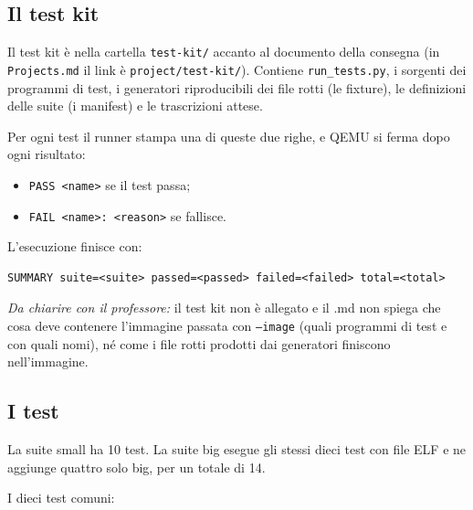 \subsection{Il test kit}

Il test kit è nella cartella \texttt{test-kit/} accanto al documento della consegna (in \texttt{Projects.md} il link è \texttt{project/test-kit/}). Contiene \texttt{run\_tests.py}, i sorgenti dei programmi di test, i generatori riproducibili dei file rotti (le fixture), le definizioni delle suite (i manifest) e le trascrizioni attese.

Per ogni test il runner stampa una di queste due righe, e QEMU si ferma dopo ogni risultato:
\begin{itemize}\sloppy
\item \texttt{PASS <name>} se il test passa;
\item \texttt{FAIL <name>:\ <reason>} se fallisce.
\end{itemize}
L'esecuzione finisce con:
\begin{lstlisting}
SUMMARY suite=<suite> passed=<passed> failed=<failed> total=<total>
\end{lstlisting}

\emph{Da chiarire con il professore:} il test kit non è allegato e il .md non spiega che cosa deve contenere l'immagine passata con \texttt{--image} (quali programmi di test e con quali nomi), né come i file rotti prodotti dai generatori finiscono nell'immagine.

\subsection{I test}

La suite small ha 10 test. La suite big esegue gli stessi dieci test con file ELF e ne aggiunge quattro solo big, per un totale di 14.

I dieci test comuni:

